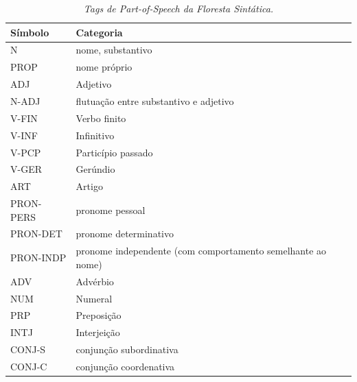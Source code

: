 \begin{table}
   \centering
   \small
   \caption{\it Tags de \emph{Part-of-Speech} da Floresta Sintática.}

    \begin{tabular}{ | p{3cm} | p{10cm} |}
      \hline
        \textbf{Símbolo} & \textbf{Categoria}\\
        \hline
        \hline

    N&nome, substantivo\\
    \hline
    PROP&nome próprio\\
    \hline
    ADJ&Adjetivo\\
    \hline
    N-ADJ&flutuação entre substantivo e adjetivo\\
    \hline
    V-FIN&Verbo finito\\
    \hline
    V-INF&Infinitivo\\
    \hline
    V-PCP&Particípio passado\\
    \hline
    V-GER&Gerúndio\\
    \hline
    ART&Artigo\\
    \hline
    PRON-PERS&pronome pessoal\\
    \hline
    PRON-DET&pronome determinativo\\
    \hline
    PRON-INDP&pronome independente (com comportamento semelhante ao nome)\\
    \hline
    ADV&Advérbio\\
    \hline
    NUM&Numeral\\
    \hline
    PRP&Preposição\\
    \hline
    INTJ&Interjeição\\
    \hline
    CONJ-S&conjunção subordinativa\\
    \hline
    CONJ-C&conjunção coordenativa\\
\hline

   \end{tabular}
   \label{tbl:floresta_sintatica_pos}
\end{table}



